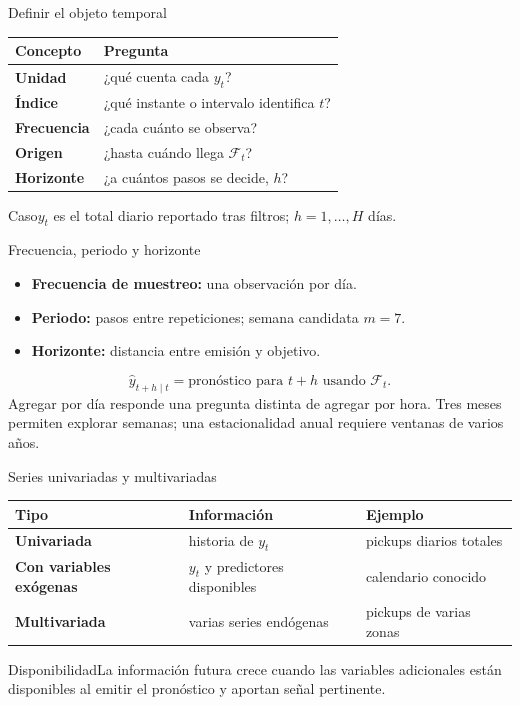 \documentclass[aspectratio=169,10pt]{beamer}
\newcommand{\concepto}[1]{\textcolor{UAPTeal}{\textbf{#1}}}
\begin{document}
\begin{frame}{Definir el objeto temporal}\small
\begin{tabularx}{\textwidth}{>{\bfseries}p{}X}\toprule Concepto & Pregunta\\\midrule Unidad & ¿qué cuenta cada $y_t$?\\ Índice & ¿qué instante o intervalo identifica $t$?\\ Frecuencia & ¿cada cuánto se observa?\\ Origen & ¿hasta cuándo llega $\mathcal F_t$?\\ Horizonte & ¿a cuántos pasos se decide, $h$?\\\bottomrule\end{tabularx}
\begin{block}{Caso}$y_t$ es el total diario reportado tras filtros; $h=1,\ldots,H$ días.\end{block}
\end{frame}

\begin{frame}{Frecuencia, periodo y horizonte}\small
\begin{itemize}\item \concepto{Frecuencia de muestreo:} una observación por día.\item \concepto{Periodo:} pasos entre repeticiones; semana candidata $m=7$.\item \concepto{Horizonte:} distancia entre emisión y objetivo.\end{itemize}
\[\widehat y_{t+h\mid t}=\text{pronóstico para }t+h\text{ usando }\mathcal F_t.\]
Agregar por día responde una pregunta distinta de agregar por hora. Tres meses permiten explorar semanas; una estacionalidad anual requiere ventanas de varios años.
\end{frame}

\begin{frame}{Series univariadas y multivariadas}\small
\begin{tabularx}{\textwidth}{>{\bfseries}p{}XX}\toprule Tipo & Información & Ejemplo\\\midrule Univariada & historia de $y_t$ & pickups diarios totales\\ Con variables exógenas & $y_t$ y predictores disponibles & calendario conocido\\ Multivariada & varias series endógenas & pickups de varias zonas\\\bottomrule\end{tabularx}
\begin{alertblock}{Disponibilidad}La información futura crece cuando las variables adicionales están disponibles al emitir el pronóstico y aportan señal pertinente.\end{alertblock}
\end{frame}
\end{document}
